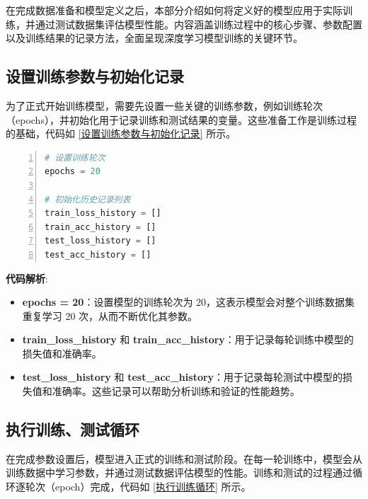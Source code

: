 在完成数据准备和模型定义之后，本部分介绍如何将定义好的模型应用于实际训练，并通过测试数据集评估模型性能。内容涵盖训练过程中的核心步骤、参数配置以及训练结果的记录方法，全面呈现深度学习模型训练的关键环节。

\subsection{设置训练参数与初始化记录}
为了正式开始训练模型，需要先设置一些关键的训练参数，例如训练轮次（epochs），并初始化用于记录训练和测试结果的变量。这些准备工作是训练过程的基础，代码如 \ref{设置训练参数与初始化记录} 所示。

\begin{lstlisting}[language={python},label={设置训练参数与初始化记录},caption={设置训练参数与初始化记录}, basicstyle=\footnotesize\ttfamily, breaklines=true, numbers=left, frame=single,keepspaces=true,showstringspaces=false]
# 设置训练轮次
epochs = 20

# 初始化历史记录列表
train_loss_history = []
train_acc_history = []
test_loss_history = []
test_acc_history = []
\end{lstlisting}
\textbf{代码解析}:
\begin{itemize}
    \item \textbf{epochs = 20}：设置模型的训练轮次为 20，这表示模型会对整个训练数据集重复学习 20 次，从而不断优化其参数。
    \item \textbf{train\_loss\_history} 和 \textbf{train\_acc\_history}：用于记录每轮训练中模型的损失值和准确率。
    \item \textbf{test\_loss\_history} 和 \textbf{test\_acc\_history}：用于记录每轮测试中模型的损失值和准确率。这些记录可以帮助分析训练和验证的性能趋势。
\end{itemize}

\subsection{执行训练、测试循环}
在完成参数设置后，模型进入正式的训练和测试阶段。在每一轮训练中，模型会从训练数据中学习参数，并通过测试数据评估模型的性能。训练和测试的过程通过循环逐轮次（epoch）完成，代码如 \ref{执行训练循环} 所示。

